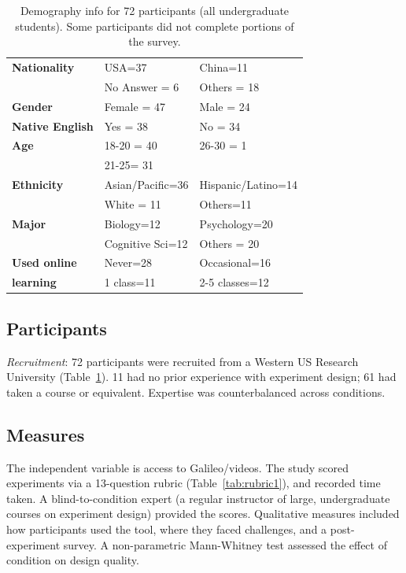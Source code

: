 \vspace{0.25in}
\begin{table}[!ht]
\caption[Demography information for 72 participants (all undergraduate students)] 
{Demography info for 72 participants (all undergraduate students). Some participants did not complete portions of the survey.}

\vspace{-0.25in}
\begin{center}
\renewcommand{\arraystretch}{1.5}
\begin{tabular}{>{\bf}p{1.5in}p{1.75in}p{1.75in}}
\hline
Nationality	&	USA=37		&	China=11\\
			&	No Answer = 6	&	Others = 18\\
Gender		&	Female = 47	&	Male = 24\\
Native English	&	Yes = 38 		&	No = 34\\
Age			&	18-20 = 40	& 	26-30 = 1\\
			&	21-25= 31	&			\\
Ethnicity		&	Asian/Pacific=36 & 	Hispanic/Latino=14\\
			&	White = 11		&	Others=11 \\
Major		&	Biology=12	& 	Psychology=20 \\
			&	Cognitive Sci=12 &	 Others = 20 \\
Used online	& 	Never=28		&	Occasional=16\\
learning		&	1 class=11	&	2-5 classes=12\\
\hline
\end{tabular}
\end{center}
\label{tab:gi-results1}
\end{table}


\subsection*{Participants}
\textit{Recruitment}: 72 participants were recruited from a Western US Research University (Table~\ref{tab:gi-results1}). 11 had no prior experience with experiment design; 61 had taken a course or equivalent. Expertise was counterbalanced across conditions.

\subsection*{Measures}
The independent variable is access to Galileo/videos. The study scored experiments via a 13-question rubric (Table~\ref{tab:rubric1}), and recorded time taken. A blind-to-condition expert (a regular instructor of large, undergraduate courses on experiment design) provided the scores. Qualitative measures included how participants used the tool, where they faced challenges, and a post-experiment survey. A non-parametric Mann-Whitney test assessed the effect of condition on design quality.

